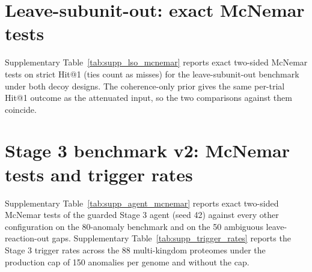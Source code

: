 \documentclass[10pt]{article}
\begin{document}


\section{Leave-subunit-out: exact McNemar tests}
\label{sec:supp_lso_mcnemar}

Supplementary Table~\ref{tab:supp_lso_mcnemar} reports exact two-sided McNemar tests on strict Hit@1 (ties count as misses) for the leave-subunit-out benchmark under both decoy designs. The coherence-only prior gives the same per-trial Hit@1 outcome as the attenuated input, so the two comparisons against them coincide.



\section{Stage 3 benchmark v2: McNemar tests and trigger rates}
\label{sec:supp_agent_v2}

Supplementary Table~\ref{tab:supp_agent_mcnemar} reports exact two-sided McNemar tests of the guarded Stage 3 agent (seed 42) against every other configuration on the 80-anomaly benchmark and on the 50 ambiguous leave-reaction-out gaps. Supplementary Table~\ref{tab:supp_trigger_rates} reports the Stage 3 trigger rates across the 88 multi-kingdom proteomes under the production cap of 150 anomalies per genome and without the cap.




\end{document}
